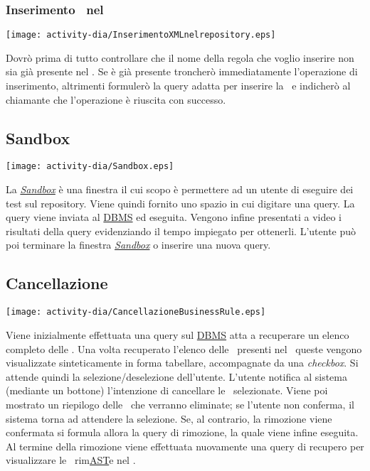 \subsubsection{Inserimento \br\ nel \rp}
\begin{center} 
 \texttt{[image: activity-dia/InserimentoXMLnelrepository.eps]}
\end{center}
Dovr\`o prima di tutto controllare che il nome della regola che voglio inserire non sia gi\`a presente nel \rp. Se \`e gi\`a presente troncher\`o immediatamente l'operazione di inserimento, altrimenti formuler\`o la query adatta per inserire la \br\ e indicher\`o al chiamante che l'operazione \`e riuscita con successo.

\subsection{Sandbox}
\begin{center}
 \texttt{[image: activity-dia/Sandbox.eps]}
\end{center}
La \textit{\underline{Sandbox}} \`e una finestra il cui scopo \`e permettere ad un utente di eseguire dei test sul repository. Viene quindi fornito uno spazio in cui digitare una query. La query viene inviata al \underline{DBMS} ed eseguita. Vengono infine presentati a video i risultati della query evidenziando il tempo impiegato per ottenerli. L'utente pu\`o poi terminare la finestra \textit{\underline{Sandbox}} o inserire una nuova query.

\subsection{Cancellazione \br}
\begin{center}
 \texttt{[image: activity-dia/CancellazioneBusinessRule.eps]}
\end{center}
Viene inizialmente effettuata una query sul \underline{DBMS} atta a recuperare un elenco completo delle \brs. Una volta recuperato l'elenco delle \brs\ presenti nel \rp\ queste vengono visualizzate sinteticamente in forma tabellare, accompagnate da una \textit{checkbox}. Si attende quindi la selezione/deselezione dell'utente. L'utente notifica al sistema (mediante un bottone) l'intenzione di cancellare le \brs\ selezionate.  Viene poi mostrato un riepilogo delle \brs\ che verranno eliminate; se l'utente non conferma, il sistema torna ad attendere la selezione. Se, al contrario, la rimozione viene confermata si formula allora la query di rimozione, la quale viene infine eseguita. Al termine della rimozione viene effettuata nuovamente una query di recupero per visualizzare le \brs\ rim\underline{AST}e nel \rp.

